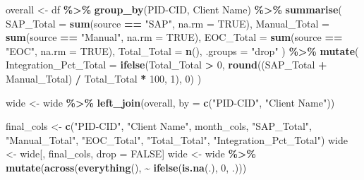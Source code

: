 \documentclass[
]{article}
\newenvironment{Shaded}{\begin{snugshade}}{\end{snugshade}}
\newcommand{\AttributeTok}[1]{\textcolor[rgb]{0.13,0.29,0.53}{#1}}
\newcommand{\ConstantTok}[1]{\textcolor[rgb]{0.56,0.35,0.01}{#1}}
\newcommand{\DecValTok}[1]{\textcolor[rgb]{0.00,0.00,0.81}{#1}}
\newcommand{\FunctionTok}[1]{\textcolor[rgb]{0.13,0.29,0.53}{\textbf{#1}}}
\newcommand{\NormalTok}[1]{#1}
\newcommand{\OtherTok}[1]{\textcolor[rgb]{0.56,0.35,0.01}{#1}}
\newcommand{\SpecialCharTok}[1]{\textcolor[rgb]{0.81,0.36,0.00}{\textbf{#1}}}
\newcommand{\StringTok}[1]{\textcolor[rgb]{0.31,0.60,0.02}{#1}}
\begin{document}
\begin{Shaded}
\begin{Highlighting}[]
\NormalTok{      overall }\OtherTok{\textless{}{-}}\NormalTok{ df }\SpecialCharTok{\%\textgreater{}\%}
        \FunctionTok{group\_by}\NormalTok{(}\StringTok{\textasciigrave{}}\AttributeTok{PID{-}CID}\StringTok{\textasciigrave{}}\NormalTok{, }\StringTok{\textasciigrave{}}\AttributeTok{Client Name}\StringTok{\textasciigrave{}}\NormalTok{) }\SpecialCharTok{\%\textgreater{}\%}
        \FunctionTok{summarise}\NormalTok{(}
          \AttributeTok{SAP\_Total    =} \FunctionTok{sum}\NormalTok{(source }\SpecialCharTok{==} \StringTok{"SAP"}\NormalTok{, }\AttributeTok{na.rm =} \ConstantTok{TRUE}\NormalTok{),}
          \AttributeTok{Manual\_Total =} \FunctionTok{sum}\NormalTok{(source }\SpecialCharTok{==} \StringTok{"Manual"}\NormalTok{, }\AttributeTok{na.rm =} \ConstantTok{TRUE}\NormalTok{),}
          \AttributeTok{EOC\_Total    =} \FunctionTok{sum}\NormalTok{(source }\SpecialCharTok{==} \StringTok{"EOC"}\NormalTok{, }\AttributeTok{na.rm =} \ConstantTok{TRUE}\NormalTok{),}
          \AttributeTok{Total\_Total  =} \FunctionTok{n}\NormalTok{(),}
          \AttributeTok{.groups =} \StringTok{"drop"}
\NormalTok{        ) }\SpecialCharTok{\%\textgreater{}\%}
        \FunctionTok{mutate}\NormalTok{(}
          \AttributeTok{Integration\_Pct\_Total =} \FunctionTok{ifelse}\NormalTok{(Total\_Total }\SpecialCharTok{\textgreater{}} \DecValTok{0}\NormalTok{,}
                                         \FunctionTok{round}\NormalTok{((SAP\_Total }\SpecialCharTok{+}\NormalTok{ Manual\_Total) }\SpecialCharTok{/}\NormalTok{ Total\_Total }\SpecialCharTok{*} \DecValTok{100}\NormalTok{, }\DecValTok{1}\NormalTok{), }\DecValTok{0}\NormalTok{)}
\NormalTok{        )}
      
\NormalTok{      wide }\OtherTok{\textless{}{-}}\NormalTok{ wide }\SpecialCharTok{\%\textgreater{}\%}
        \FunctionTok{left\_join}\NormalTok{(overall, }\AttributeTok{by =} \FunctionTok{c}\NormalTok{(}\StringTok{"PID{-}CID"}\NormalTok{, }\StringTok{"Client Name"}\NormalTok{))}
      
\NormalTok{      final\_cols }\OtherTok{\textless{}{-}} \FunctionTok{c}\NormalTok{(}\StringTok{"PID{-}CID"}\NormalTok{, }\StringTok{"Client Name"}\NormalTok{, month\_cols,}
                      \StringTok{"SAP\_Total"}\NormalTok{, }\StringTok{"Manual\_Total"}\NormalTok{, }\StringTok{"EOC\_Total"}\NormalTok{, }\StringTok{"Total\_Total"}\NormalTok{, }\StringTok{"Integration\_Pct\_Total"}\NormalTok{)}
\NormalTok{      wide }\OtherTok{\textless{}{-}}\NormalTok{ wide[, final\_cols, drop }\OtherTok{=} \ConstantTok{FALSE}\NormalTok{]}
\NormalTok{      wide }\OtherTok{\textless{}{-}}\NormalTok{ wide }\SpecialCharTok{\%\textgreater{}\%} \FunctionTok{mutate}\NormalTok{(}\FunctionTok{across}\NormalTok{(}\FunctionTok{everything}\NormalTok{(), }\SpecialCharTok{\textasciitilde{}} \FunctionTok{ifelse}\NormalTok{(}\FunctionTok{is.na}\NormalTok{(.), }\DecValTok{0}\NormalTok{, .)))}
      

\end{Highlighting}
\end{Shaded}
\end{document}
